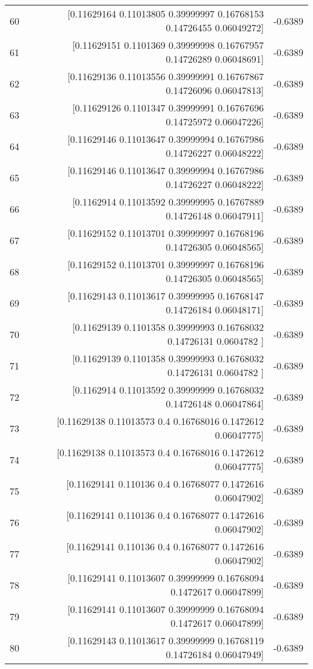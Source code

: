 \begin{longtable}{lrr}
60 & [0.11629164 0.11013805 0.39999997 0.16768153 0.14726455 0.06049272] & -0.6389 \\
61 & [0.11629151 0.1101369  0.39999998 0.16767957 0.14726289 0.06048691] & -0.6389 \\
62 & [0.11629136 0.11013556 0.39999991 0.16767867 0.14726096 0.06047813] & -0.6389 \\
63 & [0.11629126 0.1101347  0.39999991 0.16767696 0.14725972 0.06047226] & -0.6389 \\
64 & [0.11629146 0.11013647 0.39999994 0.16767986 0.14726227 0.06048222] & -0.6389 \\
65 & [0.11629146 0.11013647 0.39999994 0.16767986 0.14726227 0.06048222] & -0.6389 \\
66 & [0.1162914  0.11013592 0.39999995 0.16767889 0.14726148 0.06047911] & -0.6389 \\
67 & [0.11629152 0.11013701 0.39999997 0.16768196 0.14726305 0.06048565] & -0.6389 \\
68 & [0.11629152 0.11013701 0.39999997 0.16768196 0.14726305 0.06048565] & -0.6389 \\
69 & [0.11629143 0.11013617 0.39999995 0.16768147 0.14726184 0.06048171] & -0.6389 \\
70 & [0.11629139 0.1101358  0.39999993 0.16768032 0.14726131 0.0604782 ] & -0.6389 \\
71 & [0.11629139 0.1101358  0.39999993 0.16768032 0.14726131 0.0604782 ] & -0.6389 \\
72 & [0.1162914  0.11013592 0.39999999 0.16768032 0.14726148 0.06047864] & -0.6389 \\
73 & [0.11629138 0.11013573 0.4        0.16768016 0.1472612  0.06047775] & -0.6389 \\
74 & [0.11629138 0.11013573 0.4        0.16768016 0.1472612  0.06047775] & -0.6389 \\
75 & [0.11629141 0.110136   0.4        0.16768077 0.1472616  0.06047902] & -0.6389 \\
76 & [0.11629141 0.110136   0.4        0.16768077 0.1472616  0.06047902] & -0.6389 \\
77 & [0.11629141 0.110136   0.4        0.16768077 0.1472616  0.06047902] & -0.6389 \\
78 & [0.11629141 0.11013607 0.39999999 0.16768094 0.1472617  0.06047899] & -0.6389 \\
79 & [0.11629141 0.11013607 0.39999999 0.16768094 0.1472617  0.06047899] & -0.6389 \\
80 & [0.11629143 0.11013617 0.39999999 0.16768119 0.14726184 0.06047949] & -0.6389 \\

\end{longtable}

